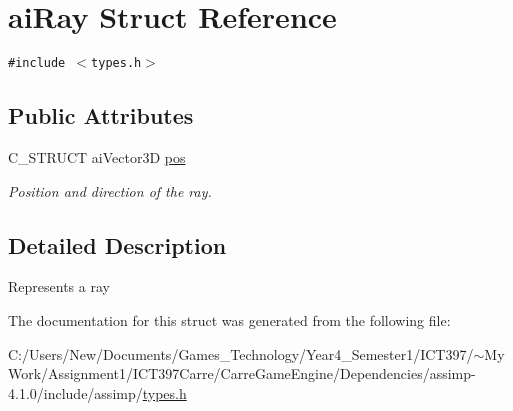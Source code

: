 \hypertarget{structai_ray}{
\section{aiRay Struct Reference}
\label{structai_ray}
}
{\tt \#include $<$types.h$>$}

\subsection*{Public Attributes}
\begin{CompactItemize}
\item 
\hypertarget{structai_ray_312f663a7d2580b1b3beb52ffd4ab4c9}{
C\_\-STRUCT aiVector3D \hyperlink{structai_ray_312f663a7d2580b1b3beb52ffd4ab4c9}{pos}}
\label{structai_ray_312f663a7d2580b1b3beb52ffd4ab4c9}

\begin{CompactList}\small\item\em Position and direction of the ray. \item\end{CompactList}\end{CompactItemize}


\subsection{Detailed Description}
Represents a ray 

The documentation for this struct was generated from the following file:\begin{CompactItemize}
\item 
C:/Users/New/Documents/Games\_\-Technology/Year4\_\-Semester1/ICT397/$\sim$My Work/Assignment1/ICT397Carre/CarreGameEngine/Dependencies/assimp-4.1.0/include/assimp/\hyperlink{types_8h}{types.h}\end{CompactItemize}
